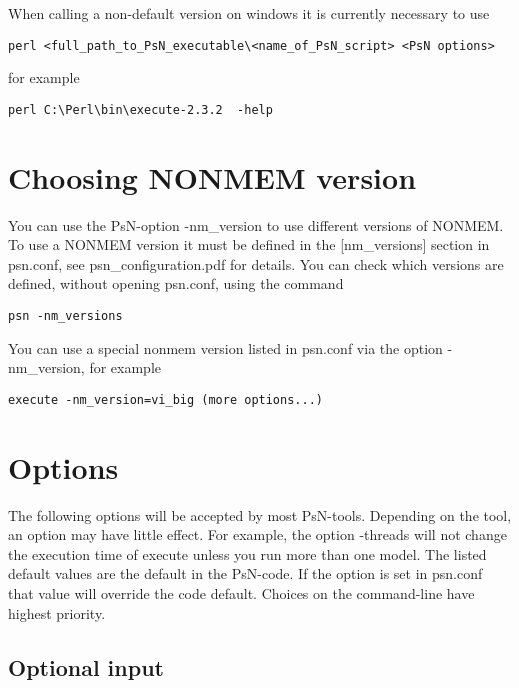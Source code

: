 \documentclass[a4paper,12pt]{article}
\begin{document}
When calling a non-default version on windows it is currently necessary to  use 
\begin{verbatim}
perl <full_path_to_PsN_executable\<name_of_PsN_script> <PsN options>
\end{verbatim}
for example
\begin{verbatim}
perl C:\Perl\bin\execute-2.3.2  -help
\end{verbatim}

\section{Choosing NONMEM version}
You can use the PsN-option -nm\_version to use different versions of NONMEM. To use a NONMEM version it must be defined in the [nm\_versions] section in psn.conf, see psn\_configuration.pdf for details. You can check which versions are defined, without opening psn.conf, using the command

\begin{verbatim}
psn -nm_versions
\end{verbatim}

You can use a special nonmem version listed in psn.conf via the option -nm\_version, for example

\begin{verbatim}
execute -nm_version=vi_big (more options...)
\end{verbatim}

\section{Options}
The following options will be accepted by most PsN-tools. Depending on the tool, an option may have little effect. For example, the option -threads will not change the execution time of execute unless you run more than one model. The listed default values are the default in the PsN-code. If the option is set in psn.conf that value will override the code default. Choices on the command-line have highest priority.

\subsection{Optional input}
\end{document}
